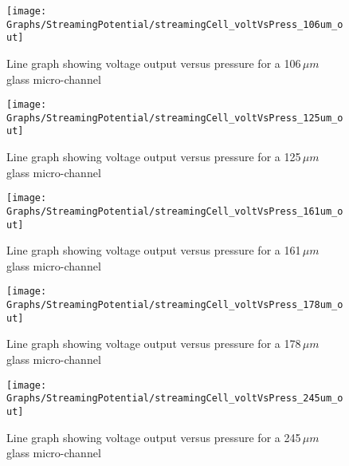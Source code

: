 \begin{figure}
\begin{centering}
\texttt{[image: Graphs/StreamingPotential/streamingCell\_voltVsPress\_106um\_out]}
\par\end{centering}

\protect\caption{Line graph showing voltage output versus pressure for a 106$\,\mu m$
glass micro-channel}
\end{figure}
\begin{figure}
\begin{centering}
\texttt{[image: Graphs/StreamingPotential/streamingCell\_voltVsPress\_125um\_out]}
\par\end{centering}

\protect\caption{Line graph showing voltage output versus pressure for a 125$\,\mu m$
glass micro-channel}
\end{figure}
\begin{figure}
\begin{centering}
\texttt{[image: Graphs/StreamingPotential/streamingCell\_voltVsPress\_161um\_out]}
\par\end{centering}

\protect\caption{Line graph showing voltage output versus pressure for a 161$\,\mu m$
glass micro-channel}
\end{figure}
\begin{figure}
\begin{centering}
\texttt{[image: Graphs/StreamingPotential/streamingCell\_voltVsPress\_178um\_out]}
\par\end{centering}

\protect\caption{Line graph showing voltage output versus pressure for a 178$\,\mu m$
glass micro-channel}
\end{figure}
\begin{figure}
\begin{centering}
\texttt{[image: Graphs/StreamingPotential/streamingCell\_voltVsPress\_245um\_out]}
\par\end{centering}

\protect\caption{Line graph showing voltage output versus pressure for a 245$\,\mu m$
glass micro-channel}
\end{figure}

